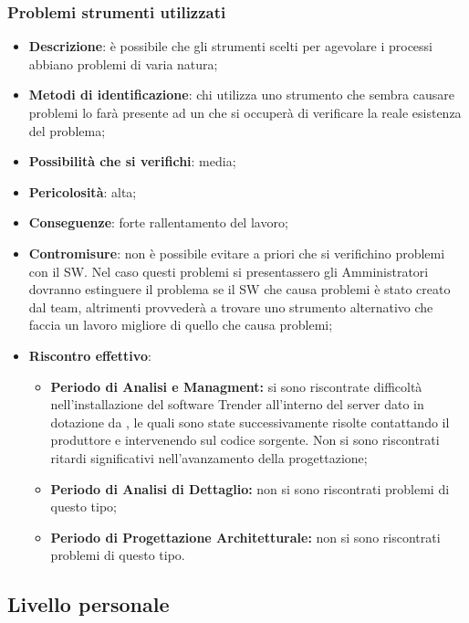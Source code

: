 		\subsubsection{Problemi  strumenti utilizzati}
		\begin{itemize}
			\item \textbf{Descrizione}: è possibile che gli strumenti scelti per agevolare i processi abbiano problemi di varia natura;
			\item \textbf{Metodi di identificazione}: chi utilizza uno strumento che sembra causare problemi lo farà presente ad un \AM{} che si occuperà di verificare la reale esistenza del problema;
			\item \textbf{Possibilità che si verifichi}: media;
			\item \textbf{Pericolosità}: alta;
			\item \textbf{Conseguenze}: forte rallentamento del lavoro;
			\item \textbf{Contromisure}: non è possibile evitare a priori che si verifichino problemi con il SW. Nel caso questi problemi si presentassero gli Amministratori dovranno estinguere il problema se il SW che causa problemi è stato creato dal team, altrimenti provvederà a trovare uno strumento alternativo che faccia un lavoro migliore di quello che causa problemi;
			\item \textbf{Riscontro effettivo}:
			\begin{itemize}
				\item \textbf{Periodo di Analisi e Managment:} si sono riscontrate difficoltà nell'installazione del software Trender all'interno del server dato in dotazione da \PROPONENTE, le quali sono state successivamente risolte contattando il produttore e intervenendo sul codice sorgente. Non si sono riscontrati ritardi significativi nell'avanzamento della progettazione;
				\item \textbf{Periodo di Analisi di Dettaglio:} non si sono riscontrati problemi di questo tipo;
				\item \textbf{Periodo di Progettazione Architetturale:} non si sono riscontrati problemi di questo tipo.
			\end{itemize}
		\end{itemize}
		
		
	\subsection{Livello personale}
	\label{sez2.2}
